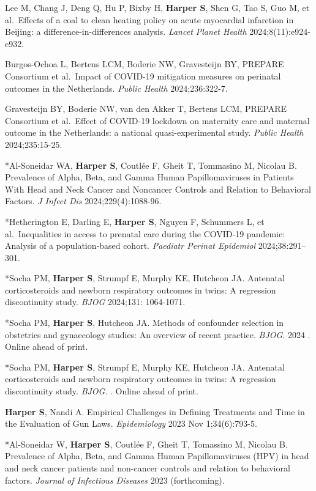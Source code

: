 \documentclass[
  letterpaper,
  DIV=11,
  numbers=noendperiod]{scrartcl}
\begin{document}
Lee M, Chang J, Deng Q, Hu P, Bixby H, \textbf{Harper S}, Shen G, Tao S,
Guo M, et al.~Effects of a coal to clean heating policy on acute
myocardial infarction in Beijing: a difference-in-differences analysis.
\emph{Lancet Planet Health} 2024;8(11):e924-e932.

Burgos-Ochoa L, Bertens LCM, Boderie NW, Gravesteijn BY, PREPARE
Consortium et al.~Impact of COVID-19 mitigation measures on perinatal
outcomes in the Netherlands. \emph{Public Health} 2024;236:322-7.

Gravesteijn BY, Boderie NW, van den Akker T, Bertens LCM, PREPARE
Consortium et al.~Effect of COVID-19 lockdown on maternity care and
maternal outcome in the Netherlands: a national quasi-experimental
study. \emph{Public Health} 2024;235:15-25.

*Al-Soneidar WA, \textbf{Harper S}, Coutlée F, Gheit T, Tommasino M,
Nicolau B. Prevalence of Alpha, Beta, and Gamma Human Papillomaviruses
in Patients With Head and Neck Cancer and Noncancer Controls and
Relation to Behavioral Factors. \emph{J Infect Dis} 2024;229(4):1088-96.

*Hetherington E, Darling E, \textbf{Harper S}, Nguyen F, Schummers L, et
al.~Inequalities in access to prenatal care during the COVID‐19
pandemic: Analysis of a population‐based cohort. \emph{Paediatr Perinat
Epidemiol} 2024;38:291--301.

*Socha PM, \textbf{Harper S}, Strumpf E, Murphy KE, Hutcheon JA.
Antenatal corticosteroids and newborn respiratory outcomes in twins: A
regression discontinuity study. \emph{BJOG} 2024;131: 1064-1071.

*Socha PM, \textbf{Harper S}, Hutcheon JA. Methods of confounder
selection in obstetrics and gynaecology studies: An overview of recent
practice. \emph{BJOG}. 2024 . Online ahead of print.

*Socha PM, \textbf{Harper S}, Strumpf E, Murphy KE, Hutcheon JA.
Antenatal corticosteroids and newborn respiratory outcomes in twins: A
regression discontinuity study. \emph{BJOG}. . Online ahead of print.

\textbf{Harper S}, Nandi A. Empirical Challenges in Defining Treatments
and Time in the Evaluation of Gun Laws. \emph{Epidemiology} 2023 Nov
1;34(6):793-5.

*Al-Soneidar W, \textbf{Harper S}, Coutlée F, Gheit T, Tomassino M,
Nicolau B. Prevalence of Alpha, Beta, and Gamma Human Papillomaviruses
(HPV) in head and neck cancer patients and non-cancer controls and
relation to behavioral factors. \emph{Journal of Infectious Diseases}
2023 (forthcoming).
\end{document}
